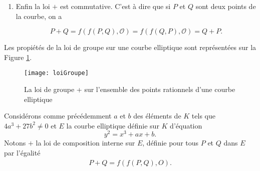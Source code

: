 \begin{demonstration}
\begin{enumerate}
        \item Enfin la loi $+$ est commutative. C'est à dire que si $P$ et $Q$ sont deux
            points de la courbe, on a

            \[
            P + Q = f(f(P,Q),\mathcal{O}) = f(f(Q,P),\mathcal{O}) = Q + P
            .\] 
    \end{enumerate}    
\end{demonstration}

Les propiétés de la loi de groupe sur une courbe elliptique sont représentées sur la Figure
\ref{fig:loiGroupe}.

\begin{figure}[H]
    \centering
    \texttt{[image: loiGroupe]}
    \caption{La loi de groupe + sur l'ensemble des points rationnels d'une courbe
    elliptique}
    \label{fig:loiGroupe}
\end{figure}

Considérons comme précédemment $a$ et $b$ des éléments de $K$ tels que $4a^3+27b^2\neq 0$ et $E$ la courbe elliptique définie sur $K$ d'équation
\[
y^2=x^3+ax+b
.\] 
Notons $+$ la loi de composition interne sur $E$, définie pour tous $P$ et $Q$ dans $E$ par l'égalité
\begin{align}
    \label{eq:groupe}
    P+Q=f(f(P,Q),O)
.\end{align}


